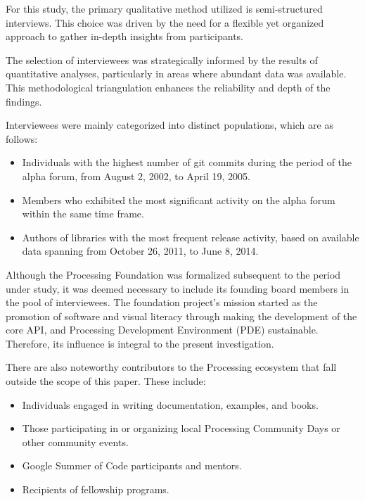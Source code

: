 For this study, the primary qualitative method utilized is semi-structured interviews. This choice was driven by the need for a flexible yet organized approach to gather in-depth insights from participants.

The selection of interviewees was strategically informed by the results of quantitative analyses, particularly in areas where abundant data was available. This methodological triangulation enhances the reliability and depth of the findings.

Interviewees were mainly categorized into distinct populations, which are as follows:

\begin{itemize}
    \item Individuals with the highest number of git commits during the period of the alpha forum, from August 2, 2002, to April 19, 2005.
    \item Members who exhibited the most significant activity on the alpha forum within the same time frame.
    \item Authors of libraries with the most frequent release activity, based on available data spanning from October 26, 2011, to June 8, 2014.
\end{itemize}

Although the Processing Foundation was formalized subsequent to the period under study, it was deemed necessary to include its founding board members in the pool of interviewees. The foundation project’s mission started as the promotion of software and visual literacy through making the development of the core API, and Processing Development Environment (PDE) sustainable. Therefore, its influence is integral to the present investigation.\parencite{robertsProcessingFoundationForm2013}

There are also noteworthy contributors to the Processing ecosystem that fall outside the scope of this paper. These include:

\begin{itemize}
    \item Individuals engaged in writing documentation, examples, and books.
    \item Those participating in or organizing local Processing Community Days or other community events.
    \item Google Summer of Code participants and mentors.
    \item Recipients of fellowship programs.
\end{itemize}

